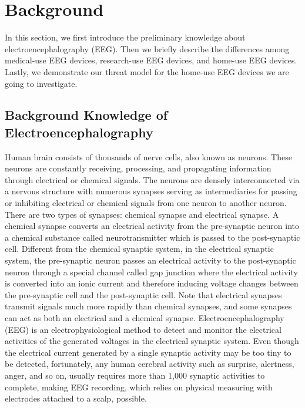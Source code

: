 \section{Background}
\label{sec:background}

In this section, we first introduce the preliminary knowledge about electroencephalography (EEG). Then we briefly describe the differences among medical-use EEG devices, research-use EEG devices, and home-use EEG devices. Lastly, we demonstrate our threat model for the home-use EEG devices we are going to investigate. 

\subsection{Background Knowledge of Electroencephalography}
Human brain consists of thousands of nerve cells, also known as neurons. These neurons are constantly receiving, processing, and propagating information through electrical or chemical signals. The neurons are densely interconnected via a nervous structure with numerous synapses serving as intermediaries for passing or inhibiting electrical or chemical signals from one neuron to another neuron. There are two types of synapses: chemical synapse and electrical synapse. A chemical synapse converts an electrical activity from the pre-synaptic neuron into a chemical substance called neurotransmitter which is passed to the post-synaptic cell. Different from the chemical synaptic system, in the electrical synaptic system, the pre-synaptic neuron passes an electrical activity to the post-synaptic neuron through a special channel called gap junction where the electrical activity is converted into an ionic current and therefore inducing voltage changes between the pre-synaptic cell and the post-synaptic cell. Note that electrical synapses transmit signals much more rapidly than chemical synapses, and some synapses can act as both an electrical and a chemical synapse. Electroencephalography (EEG) is an electrophysiological method to detect and monitor the electrical activities of the generated voltages in the electrical synaptic system. Even though the electrical current generated by a single synaptic activity may be too tiny to be detected, fortunately, any human cerebral activity such as surprise, alertness, anger, and so on, usually requires more than 1,000 synaptic activities to complete, making EEG recording, which relies on physical measuring with electrodes attached to a scalp, possible. \\
